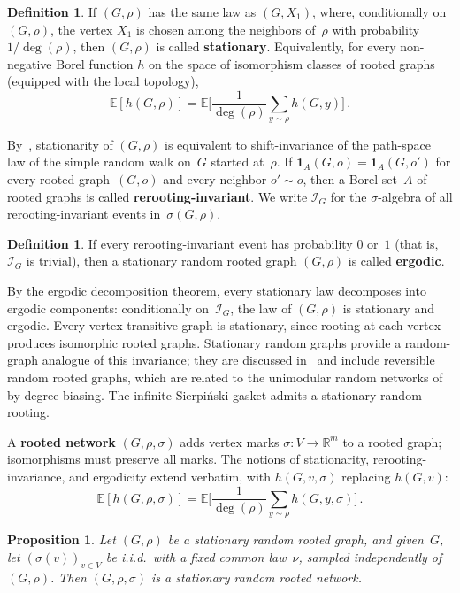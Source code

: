 \documentclass[11pt]{amsart}
\theoremstyle{plain}
\newtheorem{proposition}[theorem]{Proposition}
\theoremstyle{definition}
\newtheorem{definition}[theorem]{Definition}
\newcommand{\R}{\mathbb{R}}
\newcommand{\E}{\mathbb{E}}
\newcommand{\one}{\mathbf{1}}
\begin{document}
	\begin{definition}\label{def:stationary-graph}
		If $(G,\rho)$ has the same law as $(G,X_1)$, where, conditionally on $(G,\rho)$, the vertex $X_1$ is chosen among the neighbors of~$\rho$ with probability $1/\deg(\rho)$, then $(G,\rho)$ is called \textbf{stationary}. Equivalently, for every non-negative Borel function $h$ on the space of isomorphism classes of rooted graphs (equipped with the local topology),
		\[
		\E[h(G,\rho)] = \E\biggl[\frac{1}{\deg(\rho)}\sum_{y \sim \rho} h(G,y)\biggr]\,.
		\]
	\end{definition}
	
	By~\citet[Proposition~2.1]{BenjaminiCurien12}, stationarity of $(G,\rho)$ is equivalent to shift-invariance of the path-space law of the simple random walk on~$G$ started at~$\rho$. If $\one_A(G,o)=\one_A(G,o')$ for every rooted graph~$(G,o)$ and every neighbor $o'\sim o$, then a Borel set~$A$ of rooted graphs is called \textbf{rerooting-invariant}. We write $\mathcal{I}_G$ for the $\sigma$-algebra of all rerooting-invariant events in~$\sigma(G,\rho)$.
	
	\begin{definition}\label{def:ergodic-graph}
		If every rerooting-invariant event has probability $0$ or~$1$ (that is, $\mathcal{I}_G$ is trivial), then a stationary random rooted graph $(G,\rho)$ is called \textbf{ergodic}.
	\end{definition}
	
	By the ergodic decomposition theorem, every stationary law decomposes into ergodic components: conditionally on~$\mathcal{I}_G$, the law of $(G,\rho)$ is stationary and ergodic. Every vertex-transitive graph is stationary, since rooting at each vertex produces isomorphic rooted graphs. Stationary random graphs provide a random-graph analogue of this invariance; they are discussed in~\citet{BenjaminiCurien12} and include reversible random rooted graphs, which are related to the unimodular random networks of~\citet{AldousLyons07} by degree biasing. The infinite Sierpi\'nski gasket admits a stationary random rooting.
	
	A \textbf{rooted network} $(G,\rho,\sigma)$ adds vertex marks $\sigma\colon V \to \R^m$ to a rooted graph; isomorphisms must preserve all marks. The notions of stationarity, rerooting-invariance, and ergodicity extend verbatim, with $h(G,v,\sigma)$ replacing $h(G,v)$:
	\[
	\E[h(G,\rho,\sigma)] = \E\biggl[\frac{1}{\deg(\rho)}\sum_{y \sim \rho} h(G,y,\sigma)\biggr]\,.
	\]
	
	\begin{proposition}\label{prop:iid-stationary}
		Let $(G,\rho)$ be a stationary random rooted graph, and given~$G$, let $(\sigma(v))_{v\in V}$ be i.i.d.\ with a fixed common law~$\nu$, sampled independently of~$(G,\rho)$. Then $(G,\rho,\sigma)$ is a stationary random rooted network.
	\end{proposition}
	
\end{document}
